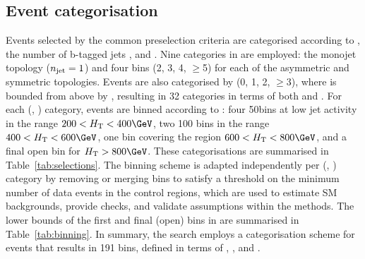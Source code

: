 \subsection{Event categorisation}
\label{sec:categorisation} 

Events selected by the common preselection criteria are categorised
according to \njet, the number of b-tagged jets \nb, and \scalht. Nine
categories in \njet are employed: the monojet topology ($n_{\text{jet}} = 1$)
and four \njet bins (2, 3, 4, $\geq$5) for each of the asymmetric and
symmetric topologies. Events are also categorised by \nb (0, 1, 2,
$\geq$3), where \nb is bounded from above by \njet, resulting in 32
categories in terms of both \njet and \nb. For each (\njet, \nb)
category, events are binned according to \scalht: four 50\GeV bins at
low jet activity in the range $200 < \scalht < 400\GeV$, two 100\GeV
bins in the range $400 < \scalht < 600\GeV$, one bin covering the
region $600 < \scalht < 800\GeV$, and a final open bin for $\scalht >
800\GeV$. These categorisations are summarised in
Table~\ref{tab:selections}. The \scalht binning scheme is adapted
independently per (\njet, \nb) category by removing or merging bins to
satisfy a threshold on the minimum number of data events in the
control regions, which are used to estimate SM backgrounds, provide
checks, and validate assumptions within the methods. The lower bounds
of the first and final (open) bins in \scalht are summarised in
Table~\ref{tab:binning}. In summary, the search employs a
categorisation scheme for events that results in 191 bins, defined in
terms of \njet, \nb, and \scalht.

